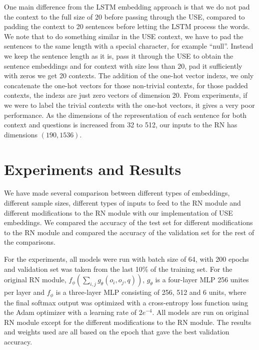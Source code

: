 \documentclass{article}
\begin{document}
One main difference from the LSTM embedding approach is that we do not pad the context to the full size of 20 before passing through the USE, compared to padding the context to 20 sentences before letting the LSTM process the words. We note that to do something similar in the USE context, we have to pad the sentences to the same length with a special character, for example ``null''. Instead we keep the sentence length as it is, pass it through the USE to obtain the sentence embeddings and for context with size less than 20, pad it sufficiently with zeros we get 20 contexts. The addition of the one-hot vector indexs, we only concatenate the one-hot vectors for those non-trivial contexts, for those padded contexts, the indexs are just zero vectors of dimension 20. From experiments, if we were to label the trivial contexts with the one-hot vectors, it gives a very poor performance. As the dimensions of the representation of each sentence for both context and questions is increased from 32 to 512, our inputs to the RN has dimensions $(190,1536)$. 

\section{Experiments and Results}


We have made several comparison between different types of embeddings, different sample sizes, different types of inputs to feed to the RN module and different modifications to the RN module with our implementation of USE embeddings. We compared the accuracy of the test set for different modifications to the RN module and compared the accuracy of the validation set for the rest of the comparisons.

 

For the experiments, all models were run with batch size of 64, with 200 epochs and validation set was taken from the last 10\% of the training set. For the original RN module, $f_\phi \left(\sum_{i,j} g_\theta (o_i,o_j,q)\right)$, $g_\theta$ is a four-layer MLP 256 unites per layer and $f_\phi$ is a three-layer MLP consisting of 256, 512 and 6 units, where the final softmax output was optimized with a cross-entropy loss function using the Adam optimizer with a learning rate of $2e^{-4}$. All models are run on original RN module except for the different modifications to the RN module. The results and weights used are all based on the epoch that gave the best validation accuracy.

 

 
\end{document}
